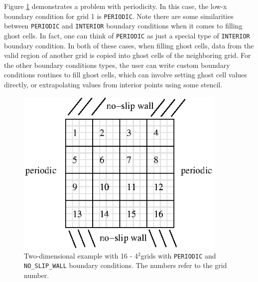 Figure \ref{fig:bc_example2} demonstrates a problem with periodicity.  In this case,
the low-x boundary condition for grid 1 is {\tt PERIODIC}.  Note there are some
similarities between {\tt PERIODIC} and {\tt INTERIOR} boundary conditions when
it comes to filling ghost cells.  In fact, one can think of {\tt PERIODIC} as just
a special type of {\tt INTERIOR} boundary condition.
In both of these cases, when filling ghost cells,
data from the valid region of another grid is copied into ghost cells of the neighboring 
grid.  For the other boundary conditions types, the user can write custom boundary 
conditions routines to fill ghost cells, which can involve setting ghost cell values 
directly, or extrapolating values from interior points using some stencil.
\begin{figure}[tb]
\centering
\includegraphics[width=4in]{./AdvancedTopics/bc_example2}
\caption{\label{fig:bc_example2}Two-dimensional example with 16 - 4$^2$grids with
{\tt PERIODIC} and {\tt NO\_SLIP\_WALL} boundary conditions.
The numbers refer to the grid number.}
\end{figure}

